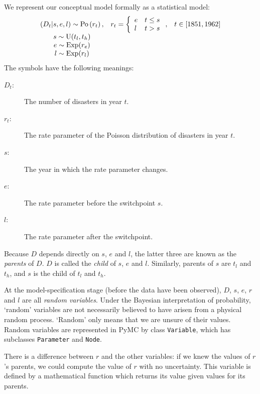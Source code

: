 We represent our conceptual model formally as a statistical model:
\begin{equation}
    \begin{array}{ccc}
        (D_t | s, e, l) \sim \textup{Po}\left(r_t\right), & r_t=\left\{\begin{array}{ll}
            e & t\le s\\ l & t>s
            \end{array}\right.,&t\in[1851,1962]\\
        s\sim \textup{U}(t_l, t_h)\\
        e\sim \textup{Exp}(r_e)\\
        l\sim \textup{Exp}(r_l)        
    \end{array}
    \label{disastermodel} 
\end{equation}
The symbols have the following meanings:
\begin{description}
    \item[$D_t$:] The number of disasters in year $t$.
    \item[$r_t$:] The rate parameter of the Poisson distribution of disasters in year $t$.
    \item[$s$:] The year in which the rate parameter changes.
    \item[$e$:] The rate parameter before the switchpoint $s$.
    \item[$l$:] The rate parameter after the switchpoint.
\end{description}
Because $D$ depends directly on $s$, $e$ and $l$, the latter three are known as the \emph{parents} of $D$. $D$ is called the \emph{child} of $s$, $e$ and $l$. Similarly, parents of $s$ are $t_l$ and $t_h$, and $s$ is the child of $t_l$ and $t_h$.

At the model-specification stage (before the data have been observed), $D$, $s$, $e$, $r$ and $l$ are all \emph{random variables}. Under the Bayesian interpretation of probability, `random' variables are not necessarily believed to have arisen from a physical random process. `Random' only means that we are unsure of their values. Random variables are represented in PyMC by class \texttt{Variable}, which has subclasses \texttt{Parameter} and \texttt{Node}.

There is a difference between $r$ and the other variables: if we knew the values of $r$'s parents, we could compute the value of $r$ with no uncertainty. This variable is defined by a mathematical function which returns its value given values for its parents. 

